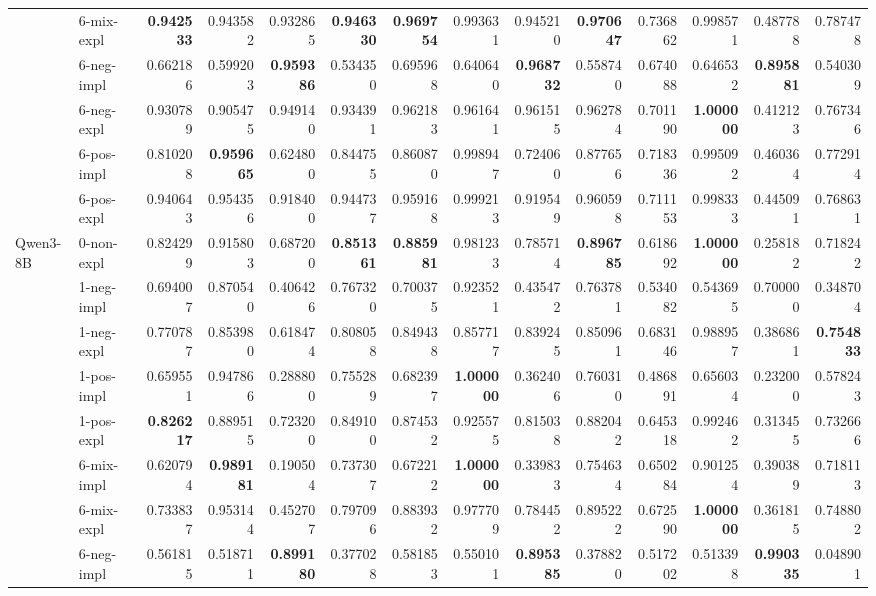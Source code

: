 \begin{tabular}{ll|rrrr|rrrr|rrrr}
 & 6-mix-expl & \bfseries 0.942533 & 0.943582 & 0.932865 & \bfseries 0.946330 & \bfseries 0.969754 & 0.993631 & 0.945210 & \bfseries 0.970647 & 0.736862 & 0.998571 & 0.487788 & 0.787478 \\
 & 6-neg-impl & 0.662186 & 0.599203 & \bfseries 0.959386 & 0.534350 & 0.695968 & 0.640640 & \bfseries 0.968732 & 0.558740 & 0.674088 & 0.646532 & \bfseries 0.895881 & 0.540309 \\
 & 6-neg-expl & 0.930789 & 0.905475 & 0.949140 & 0.934391 & 0.962183 & 0.961641 & 0.961515 & 0.962784 & 0.701190 & \bfseries 1.000000 & 0.412123 & 0.767346 \\
 & 6-pos-impl & 0.810208 & \bfseries 0.959665 & 0.624800 & 0.844755 & 0.860870 & 0.998947 & 0.724060 & 0.877656 & 0.718336 & 0.995092 & 0.460364 & 0.772914 \\
 & 6-pos-expl & 0.940643 & 0.954356 & 0.918400 & 0.944737 & 0.959168 & 0.999213 & 0.919549 & 0.960598 & 0.711153 & 0.998333 & 0.445091 & 0.768631 \\
 \midrule
\multirow[t]{11}{*}{Qwen3-8B} & 0-non-expl & 0.824299 & 0.915803 & 0.687200 & \bfseries 0.851361 & \bfseries 0.885981 & 0.981233 & 0.785714 & \bfseries 0.896785 & 0.618692 & \bfseries 1.000000 & 0.258182 & 0.718242 \\
 & 1-neg-impl & 0.694007 & 0.870540 & 0.406426 & 0.767320 & 0.700375 & 0.923521 & 0.435472 & 0.763781 & 0.534082 & 0.543695 & 0.700000 & 0.348704 \\
 & 1-neg-expl & 0.770787 & 0.853980 & 0.618474 & 0.808058 & 0.849438 & 0.857717 & 0.839245 & 0.850961 & 0.683146 & 0.988957 & 0.386861 & \bfseries 0.754833 \\
 & 1-pos-impl & 0.659551 & 0.947866 & 0.288800 & 0.755289 & 0.682397 & \bfseries 1.000000 & 0.362406 & 0.760310 & 0.486891 & 0.656034 & 0.232000 & 0.578243 \\
 & 1-pos-expl & \bfseries 0.826217 & 0.889515 & 0.723200 & 0.849100 & 0.874532 & 0.925575 & 0.815038 & 0.882042 & 0.645318 & 0.992462 & 0.313455 & 0.732666 \\
 & 6-mix-impl & 0.620794 & \bfseries 0.989181 & 0.190504 & 0.737307 & 0.672212 & \bfseries 1.000000 & 0.339833 & 0.754634 & 0.650284 & 0.901254 & 0.390389 & 0.718113 \\
 & 6-mix-expl & 0.733837 & 0.953144 & 0.452707 & 0.797096 & 0.883932 & 0.977709 & 0.784452 & 0.895222 & 0.672590 & \bfseries 1.000000 & 0.361815 & 0.748802 \\
 & 6-neg-impl & 0.561815 & 0.518711 & \bfseries 0.899180 & 0.377028 & 0.581853 & 0.550101 & \bfseries 0.895385 & 0.378820 & 0.517202 & 0.513398 & \bfseries 0.990335 & 0.048901 \\

\end{tabular}
